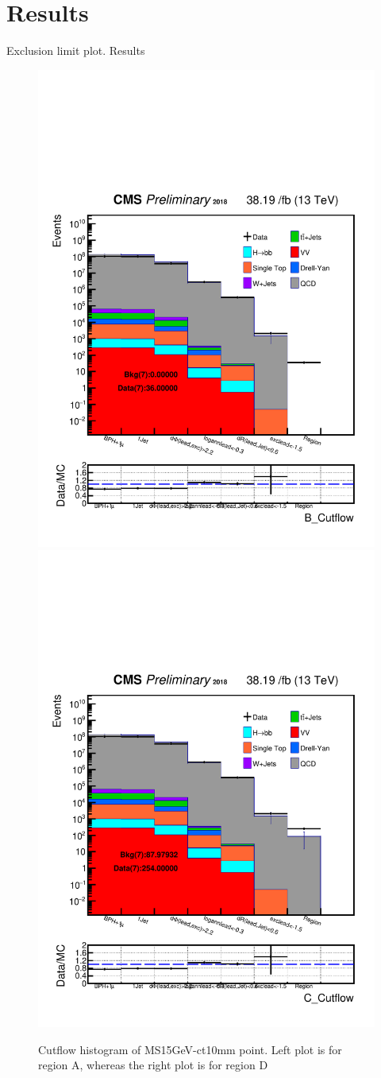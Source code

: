 \clearpage
\chapter{Results}\label{sec:results}
Exclusion limit plot.
Results

 \begin{figure}[h!]
   \caption{Cutflow histogram of MS15GeV-ct10mm point. Left plot is for region A, whereas the right plot is for region D}
   \label{fig:ABmethod}
   \centering
   \includegraphics[width=0.47\linewidth]{figs/Data_log_CutflAnalysisNote_MS-15_ctauS-10_B_Cutflow.pdf}
   \includegraphics[width=0.47\linewidth]{figs/Data_log_CutflAnalysisNote_MS-15_ctauS-10_C_Cutflow.pdf}

\end{figure}
